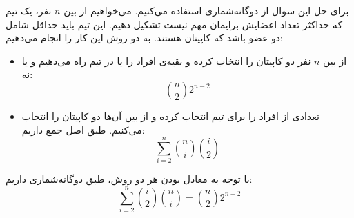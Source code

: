 \p
برای حل این سوال از دوگانه‌شماری استفاده می‌کنیم. می‌خواهیم از بین
$n$
نفر، یک تیم که حداکثر تعداد اعضایش برایمان مهم نیست تشکیل دهیم. این تیم باید حداقل شامل دو عضو باشد که کاپیتان هستند. به دو روش این کار را انجام می‌دهیم:
\begin{itemize}
\item
از بین 
$n$
نفر دو کاپیتان را انتخاب کرده و بقیه‌ی افراد را یا در تیم راه می‌دهیم و یا نه:
$$\binom{n}{2}2^{n-2}$$
\item
تعدادی از افراد را برای تیم انتخاب کرده و از بین آن‌ها دو کاپیتان را انتخاب می‌کنیم. طبق اصل جمع داریم:
$$\sum_{i=2}^{n}\binom{n}{i}\binom{i}{2}$$
\end{itemize}
با توجه به معادل بودن هر دو روش، طبق دوگانه‌شماری داریم:
$$\sum_{i=2}^{n}\binom{i}{2}\binom{n}{i} = \binom{n}{2}2^{n-2}$$
